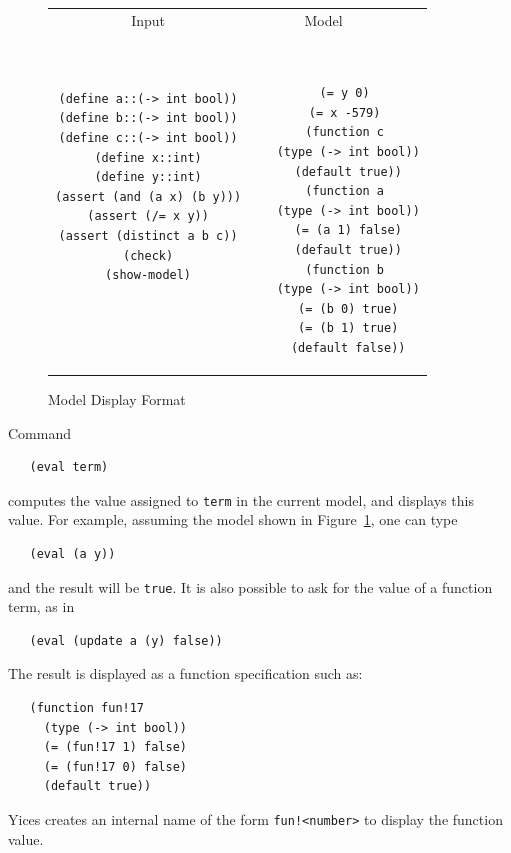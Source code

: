 \documentclass[11pt,twoside,fleqn,openright,titlepage]{cslreport}
\begin{document}
\begin{figure}
\begin{footnotesize}
\begin{center}
\begin{tabular}{c|c}
\multicolumn{1}{c}{Input} & \multicolumn{1}{c}{Model~~~~} \\[0.4em]

\begin{minipage}[c]{6cm}
\begin{verbatim}
(define a::(-> int bool))
(define b::(-> int bool))
(define c::(-> int bool))
(define x::int)
(define y::int)
(assert (and (a x) (b y)))
(assert (/= x y))
(assert (distinct a b c))
(check)
(show-model)
\end{verbatim}
\end{minipage}~~
&
~~~\begin{minipage}[c]{6cm}
\begin{verbatim}
  (= y 0)
  (= x -579)
  (function c
   (type (-> int bool))
   (default true))
  (function a
   (type (-> int bool))
   (= (a 1) false)
   (default true))
  (function b
   (type (-> int bool))
   (= (b 0) true)
   (= (b 1) true)
   (default false))
\end{verbatim}
\end{minipage}
\end{tabular}
\end{center}
\end{footnotesize}
\caption{Model Display Format}
\label{model-format}
\end{figure}

\pagebreak

\medskip\noindent
Command
\begin{small}
\begin{verbatim}
   (eval term)
\end{verbatim}
\end{small}
computes the value assigned to \texttt{term} in the current model,
and displays this value. For example, assuming the model shown in
Figure~\ref{model-format}, one can type
\begin{small}
\begin{verbatim}
   (eval (a y))
\end{verbatim}
\end{small}
and the result will be \texttt{true}. It is also possible to ask for
the value of a function term, as in
\begin{small}
\begin{verbatim}
   (eval (update a (y) false))
\end{verbatim}
\end{small}
The result is displayed as a function specification such as:
\begin{small}
\begin{verbatim}
   (function fun!17
     (type (-> int bool))
     (= (fun!17 1) false)
     (= (fun!17 0) false)
     (default true))
\end{verbatim}
\end{small}
Yices creates an internal name of the form \texttt{fun!<number>} to
display the function value.
\end{document}
